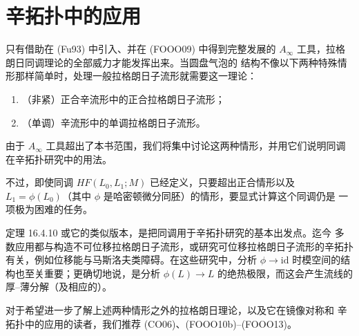 \chapter{辛拓扑中的应用}
\label{ch:applications}

只有借助\personFukaya{}在 (Fu93) 中引入、并在 (FOOO09) 中得到完整发展的
$A_\infty$ 工具，拉格朗日\personFloer{}同调理论的全部威力才能发挥出来。当圆盘气泡的
结构不像以下两种特殊情形那样简单时，处理一般拉格朗日子流形就需要这一理论：
\begin{enumerate}[label=(\arabic*)]
\item （非紧）正合辛流形中的正合拉格朗日子流形；
\item （单调）辛流形中的单调拉格朗日子流形。
\end{enumerate}
由于 $A_\infty$ 工具超出了本书范围，我们将集中讨论这两种情形，并用它们说明\personFloer{}同调在辛拓扑研究中的用法。

不过，即使\personFloer{}同调 $HF(L_0,L_1;M)$ 已经定义，只要超出正合情形以及
$L_1=\phi(L_0)$（其中 $\phi$ 是哈密顿微分同胚）的情形，要显式计算这个同调仍是
一项极为困难的任务。

定理 16.4.10 或它的类似版本，是把\personFloer{}同调用于辛拓扑研究的基本出发点。迄今
多数应用都与构造不可位移拉格朗日子流形，或研究可位移拉格朗日子流形的辛拓扑
有关，例如\personHofer{}位移能与马斯洛夫类障碍。在这些研究中，分析
$\phi\to\mathrm{id}$ 时\personFloer{}模空间的结构也至关重要；更确切地说，是分析
$\phi(L)\to L$ 的绝热极限，而这会产生\personFloer{}流线的厚--薄分解（及相应的\termThickThinDichotomy{}）。

对于希望进一步了解上述两种情形之外的拉格朗日\personFloer{}理论，以及它在镜像对称和
辛拓扑中的应用的读者，我们推荐 (CO06)、(FOOO10b)--(FOOO13)。







